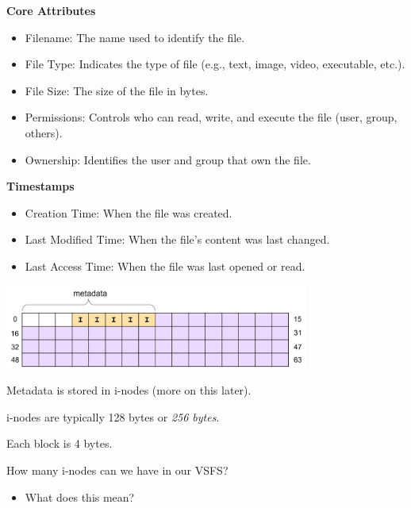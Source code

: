 \begin{slide}

    \bigskip

    \textbf{Core Attributes}
    \begin{itemize}
        \item Filename: The name used to identify the file.
        \item File Type: Indicates the type of file (e.g., text, image, video, executable, etc.).
        \item File Size: The size of the file in bytes.
        \item Permissions: Controls who can read, write, and execute the file (user, group, others).
        \item Ownership: Identifies the user and group that own the file.
    \end{itemize}
    \bigskip

    \textbf{Timestamps}
    \begin{itemize}
        \item Creation Time: When the file was created.
        \item Last Modified Time: When the file's content was last changed.
        \item Last Access Time: When the file was last opened or read.
    \end{itemize}

\end{slide}

\begin{slide}

    
    \includegraphics[width=100mm]{VSFS-2.png}
    \bigskip

    Metadata is stored in i-nodes (more on this later).
    \bigskip

    i-nodes are typically 128 bytes or \textit{256 bytes}.

    Each block is 4 bytes.
    \bigskip

    How many i-nodes can we have in our VSFS?
    \begin{itemize}
        \item What does this mean?
    \end{itemize}

\end{slide}

